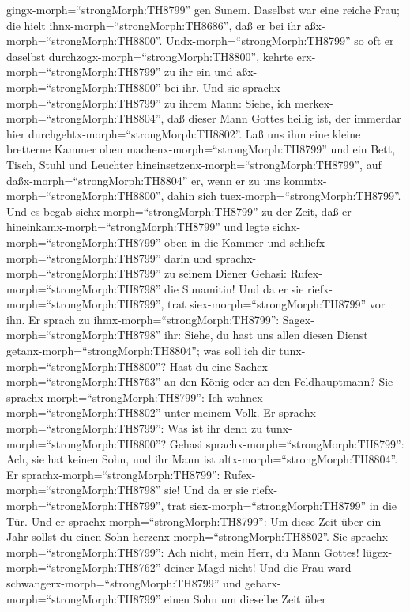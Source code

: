 gingx-morph=``strongMorph:TH8799'' gen Sunem. Daselbst war eine reiche
Frau; die hielt ihnx-morph=``strongMorph:TH8686'', daß er bei ihr
aßx-morph=``strongMorph:TH8800''. Undx-morph=``strongMorph:TH8799'' so
oft er daselbst durchzogx-morph=``strongMorph:TH8800'', kehrte
erx-morph=``strongMorph:TH8799'' zu ihr ein und
aßx-morph=``strongMorph:TH8800'' bei ihr.  Und sie
sprachx-morph=``strongMorph:TH8799'' zu ihrem Mann: Siehe, ich
merkex-morph=``strongMorph:TH8804'', daß dieser Mann Gottes heilig ist,
der immerdar hier durchgehtx-morph=``strongMorph:TH8802''. 
Laß uns ihm eine kleine bretterne Kammer oben
machenx-morph=``strongMorph:TH8799'' und ein Bett, Tisch, Stuhl und
Leuchter hineinsetzenx-morph=``strongMorph:TH8799'', auf
daßx-morph=``strongMorph:TH8804'' er, wenn er zu uns
kommtx-morph=``strongMorph:TH8800'', dahin sich
tuex-morph=``strongMorph:TH8799''.  Und es begab
sichx-morph=``strongMorph:TH8799'' zu der Zeit, daß er
hineinkamx-morph=``strongMorph:TH8799'' und legte
sichx-morph=``strongMorph:TH8799'' oben in die Kammer und
schliefx-morph=``strongMorph:TH8799'' darin  und
sprachx-morph=``strongMorph:TH8799'' zu seinem Diener Gehasi:
Rufex-morph=``strongMorph:TH8798'' die Sunamitin! Und da er sie
riefx-morph=``strongMorph:TH8799'', trat
siex-morph=``strongMorph:TH8799'' vor ihn.  Er sprach zu
ihmx-morph=``strongMorph:TH8799'': Sagex-morph=``strongMorph:TH8798''
ihr: Siehe, du hast uns allen diesen Dienst
getanx-morph=``strongMorph:TH8804''; was soll ich dir
tunx-morph=``strongMorph:TH8800''? Hast du eine
Sachex-morph=``strongMorph:TH8763'' an den König oder an den
Feldhauptmann? Sie sprachx-morph=``strongMorph:TH8799'': Ich
wohnex-morph=``strongMorph:TH8802'' unter meinem Volk.  Er
sprachx-morph=``strongMorph:TH8799'': Was ist ihr denn zu
tunx-morph=``strongMorph:TH8800''? Gehasi
sprachx-morph=``strongMorph:TH8799'': Ach, sie hat keinen Sohn, und ihr
Mann ist altx-morph=``strongMorph:TH8804''.  Er
sprachx-morph=``strongMorph:TH8799'': Rufex-morph=``strongMorph:TH8798''
sie! Und da er sie riefx-morph=``strongMorph:TH8799'', trat
siex-morph=``strongMorph:TH8799'' in die Tür.  Und er
sprachx-morph=``strongMorph:TH8799'': Um diese Zeit über ein Jahr sollst
du einen Sohn herzenx-morph=``strongMorph:TH8802''. Sie
sprachx-morph=``strongMorph:TH8799'': Ach nicht, mein Herr, du Mann
Gottes! lügex-morph=``strongMorph:TH8762'' deiner Magd nicht!
 Und die Frau ward schwangerx-morph=``strongMorph:TH8799''
und gebarx-morph=``strongMorph:TH8799'' einen Sohn um dieselbe Zeit über
